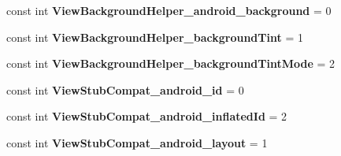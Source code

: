 \begin{DoxyCompactItemize}
const int {\bfseries View\+Background\+Helper\+\_\+android\+\_\+background} = 0
\item 
\mbox{\label{class_sample_app_1_1_droid_1_1_resource_1_1_styleable_ab6cde2a1b811ae11a62fe4ba3c6ba6f8}} 
const int {\bfseries View\+Background\+Helper\+\_\+background\+Tint} = 1
\item 
\mbox{\label{class_sample_app_1_1_droid_1_1_resource_1_1_styleable_a4bf21d8cad91fa18370cfcfc56c6c95d}} 
const int {\bfseries View\+Background\+Helper\+\_\+background\+Tint\+Mode} = 2
\item 
\mbox{\label{class_sample_app_1_1_droid_1_1_resource_1_1_styleable_aed0b7841f345897830f430f2812d52a3}} 
const int {\bfseries View\+Stub\+Compat\+\_\+android\+\_\+id} = 0
\item 
\mbox{\label{class_sample_app_1_1_droid_1_1_resource_1_1_styleable_a039ef5b13cb97f64e40dcca3eb96e712}} 
const int {\bfseries View\+Stub\+Compat\+\_\+android\+\_\+inflated\+Id} = 2
\item 
\mbox{\label{class_sample_app_1_1_droid_1_1_resource_1_1_styleable_ab9a431357a7dc4b49951c9d23fad9cb8}} 
const int {\bfseries View\+Stub\+Compat\+\_\+android\+\_\+layout} = 1
\end{DoxyCompactItemize}

